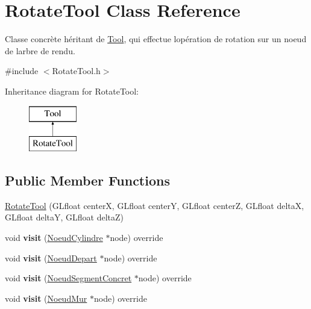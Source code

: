 \hypertarget{class_rotate_tool}{}\section{Rotate\+Tool Class Reference}
\label{class_rotate_tool}


Classe concrète héritant de \hyperlink{class_tool}{Tool}, qui effectue l\textquotesingle{}opération de rotation sur un noeud de l\textquotesingle{}arbre de rendu.  




{\ttfamily \#include $<$Rotate\+Tool.\+h$>$}

Inheritance diagram for Rotate\+Tool\+:\begin{figure}[H]
\begin{center}
\leavevmode
\includegraphics[height=2.000000cm]{class_rotate_tool}
\end{center}
\end{figure}
\subsection*{Public Member Functions}
\begin{DoxyCompactItemize}
\item 
\hyperlink{group__inf2990_ga53087375f63f0e400fdd0bf569e90ad0}{Rotate\+Tool} (G\+Lfloat center\+X, G\+Lfloat center\+Y, G\+Lfloat center\+Z, G\+Lfloat delta\+X, G\+Lfloat delta\+Y, G\+Lfloat delta\+Z)
\item 
\hypertarget{group__inf2990_ga4142a7bdd90761c6dbda240a3fe62b5d}{}void {\bfseries visit} (\hyperlink{class_noeud_cylindre}{Noeud\+Cylindre} $\ast$node) override\label{group__inf2990_ga4142a7bdd90761c6dbda240a3fe62b5d}

\item 
\hypertarget{group__inf2990_ga9649bf652069731e900bb850bd3f8475}{}void {\bfseries visit} (\hyperlink{class_noeud_depart}{Noeud\+Depart} $\ast$node) override\label{group__inf2990_ga9649bf652069731e900bb850bd3f8475}

\item 
\hypertarget{group__inf2990_ga6a6b02897bd7b72119e7a4463d408d47}{}void {\bfseries visit} (\hyperlink{class_noeud_segment_concret}{Noeud\+Segment\+Concret} $\ast$node) override\label{group__inf2990_ga6a6b02897bd7b72119e7a4463d408d47}

\item 
\hypertarget{group__inf2990_gaa3542aa6a6a3f763a133b4003d30c41f}{}void {\bfseries visit} (\hyperlink{class_noeud_mur}{Noeud\+Mur} $\ast$node) override\label{group__inf2990_gaa3542aa6a6a3f763a133b4003d30c41f}

\end{DoxyCompactItemize}
